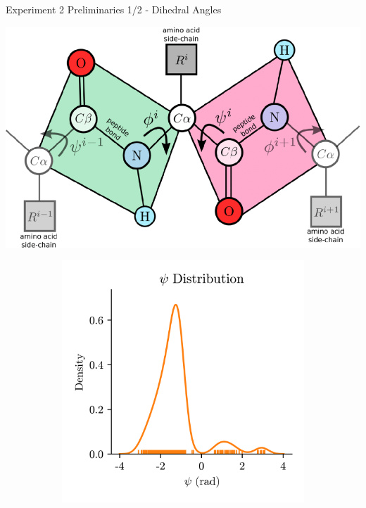 \documentclass[aspectratio=169, 10pt, dvipsnames, handout]{beamer}
\begin{document}
{
  \begin{frame}[fragile]{Experiment 2 Preliminaries 1/2 - Dihedral Angles}
    \begin{minipage}{0.4\textwidth}
      \centering
      \includegraphics[width=\textwidth]{./figures/phi_psi.png}
    \end{minipage}
    \pause\begin{minipage}{0.3\textwidth}
      \begin{adjustbox}{minipage=\linewidth,scale=0.8}
        \begin{figure}
          \centering
          \begin{subfigure}{\textwidth}
            \includegraphics[width=\textwidth]{./figures/dehedral_dist_psi.png}

\end{subfigure}
\end{figure}
\end{adjustbox}
\end{minipage}
\end{frame}}
\end{document}
